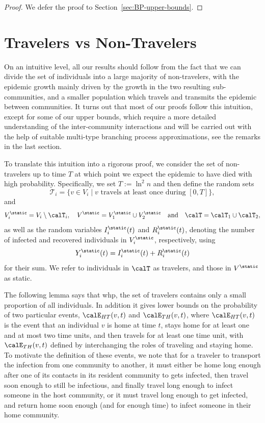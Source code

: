 \documentclass[11pt]{article}
\begin{document}
\begin{proof}
    We defer the proof to Section~\ref{sec:BP-upper-bounds}.
\end{proof}




\section{Travelers vs Non-Travelers}

On an intuitive level, all our results should follow from the fact that we can divide the set of individuals into a large majority of non-travelers, with the epidemic growth mainly driven by the growth in the two resulting sub-communities, and a smaller population which travels and transmits the epidemic between communities.  It turns out that most of our proofs follow this intuition, except for some of our upper bounds, which require a more detailed understanding of the inter-community interactions and will be carried out with the help of suitable multi-type branching process approximations, see the remarks in the last section.

To translate this intuition into a rigorous proof, we consider the set of non-travelers up to time $T$ at which point we expect the epidemic to have died with high probability.  Specifically, we set 
 $T := \ln^2 n$ and then define the random sets
\[
   \mathcal{T}_i = \{v \in V_i \mid v \text{ travels at least once during } [0,T]\},
\]
and
\[V_i^{\static}=V_i\setminus {\calT}_i,\quad
V^{\static}=V_1^{\static}\cup V_2^{\static}
\quad\text{and}\quad \calT=\calT_1\cup\calT_2,\]
as well as the random variables
$I_i^{\static}(t)$ and $R_i^{\static}(t)$,
denoting the number of infected and recovered individuals in $V_i^{\static}$, respectively, using
\begin{equation}\label{Yi-definition}
 Y_i^\static(t)=I_i^{\static}(t) + R_i^{\static}(t)   
\end{equation}
for their sum. We refer to individuals in  $\calT$ as travelers, and those in $V^\static$ as static.

The following lemma says that whp, the set of travelers contains only a small proportion of all individuals. In addition it  gives lower bounds on the probability of two particular events, $\calE_{HT}(v,t)$ and  $\calE_{TH}(v,t)$, where  $\calE_{HT}(v,t)$ is the event that an individual $v$ is home at time $t$, stays home for at least one and at most two time units, and then travels for at least one time unit, with  $\calE_{TH}(v,t)$ defined by interchanging the roles of traveling and staying home. To motivate the definition of these events, we note that for a traveler to transport the infection from one community to another, it must either be  home long enough after one of its contacts in its resident community to gets infected, then travel soon enough to still be infectious, and finally travel long enough to infect someone in the host community, or it must travel long enough to get infected, and return home soon enough (and for enough time) to infect someone in their home community.
\end{document}
